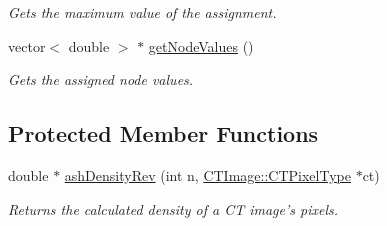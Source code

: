 \begin{DoxyCompactItemize}
\begin{DoxyCompactList}\small\item\em Gets the maximum value of the assignment. \item\end{DoxyCompactList}\item 
\hypertarget{classassignment_1_1_node_property_assigner_afc2fb3b88d92a968c65b5759a9fe1411}{
vector$<$ double $>$ $\ast$ \hyperlink{classassignment_1_1_node_property_assigner_afc2fb3b88d92a968c65b5759a9fe1411}{getNodeValues} ()}
\label{classassignment_1_1_node_property_assigner_afc2fb3b88d92a968c65b5759a9fe1411}

\begin{DoxyCompactList}\small\item\em Gets the assigned node values. \item\end{DoxyCompactList}\end{DoxyCompactItemize}
\subsection*{Protected Member Functions}
\begin{DoxyCompactItemize}
\item 
double $\ast$ \hyperlink{classassignment_1_1_node_property_assigner_af6a16969141073a2af5b898a3b69cf55}{ashDensityRev} (int n, \hyperlink{classctimage_1_1_c_t_image_ab3bf32a276d168a705973d8d6c698cec}{CTImage::CTPixelType} $\ast$ct)
\begin{DoxyCompactList}\small\item\em Returns the calculated density of a CT image's pixels. \item\end{DoxyCompactList}\end{DoxyCompactItemize}

